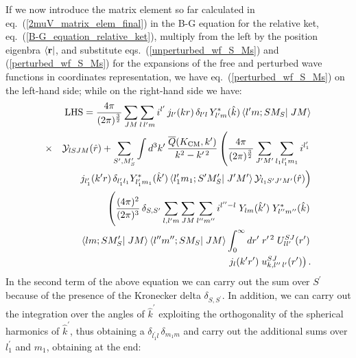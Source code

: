 \documentclass[aps,twocolumn,showpacs,preprintnumbers,amsmath,amssymb,nofootinbib,superscriptaddress,showkeys,noeprint]{revtex4-1}
\newcommand{\nr}{{\bf r}}
\begin{document}
If we now introduce the matrix element so far calculated in
eq.~(\ref{2muV_matrix_elem_final}) in the B-G equation for the
relative ket, eq.~(\ref{B-G_equation_relative_ket}), multiply from the
left by the position eigenbra $\left\langle \nr\right|$, and
substitute eqs.~(\ref{unperturbed_wf_S_Ms}) and
(\ref{perturbed_wf_S_Ms}) for the expansions of the free and perturbed
wave functions in coordinates representation, we have
eq.~(\ref{perturbed_wf_S_Ms}) on the left-hand side; while on the
right-hand side we have:
\begin{eqnarray}
 &&{\rm LHS}=\frac{4\pi}{(2\pi)^\frac32}
 \sum_{JM}\sum_{l\,l^\prime m}
 i^{l^\prime}\,
 j_{l^\prime}(kr)\,
 \delta_{l^\prime l}\,
 Y^*_{l^\prime m}(\hat{k}) \left\langle
 l^\prime m;SM_S\right|
 \left. JM\right\rangle
 \nonumber\\
&\times& \mathcal{Y}_{lSJM}(\hat{r})+
\sum_{S^\prime,M^\prime_S}\int d^3k^\prime\,
\frac{\overline{Q}(K_{\rm CM},k^\prime)}{k^2-k^{\prime\,2}}
\left(\frac{4\pi}{(2\pi)^\frac32}
\sum_{J^\prime M^\prime}
\sum_{l_1 l^\prime_1 m_1} i^{l^\prime_1}
\right.\nonumber\\
&&\left. j_{l^\prime_1}(k^\prime r)\,
\delta_{l^\prime_1 l_1}
Y^*_{l^\prime_1 m_1}(\hat{k}^\prime)
\left\langle l^\prime_1
m_1;S^\prime M^\prime_S
\right|\left. J^\prime
M^\prime\right\rangle
\mathcal{Y}_{l_1 S^\prime J^\prime M^\prime}(\hat{r})
\right)\nonumber\\
&&\left(
\frac{(4\pi)^2}{(2\pi)^3}\,
\delta_{S,S^\prime}
\sum_{l,l^\prime m}
\sum_{JM}\sum_{l^{\prime\prime}m^{\prime\prime}}
i^{l^{\prime\prime}-l}
\;Y_{lm}(\hat{k}^\prime)
\;Y^*_{l^{\prime\prime}m^{\prime\prime}}(\hat{k})\right.
\nonumber\\
&&\left.\left\langle
lm;SM^\prime_S\right|
\left. JM\right\rangle
\left\langle l^{\prime\prime}m^{\prime\prime};SM_S
\right|\left. JM
\right\rangle
\int^\infty_0 dr^\prime
\; r^{\prime\,2}\;
U^{SJ}_{l l^\prime}(r^\prime)\right.\nonumber\\
&&\left.j_l(k^\prime
r^\prime)\;u^{SJ}_{k,l^{\prime\prime}\,l^\prime}(r^\prime)
\right).\label{rhs_bg_eq_relative}
\end{eqnarray}
In the second term of the above equation we can carry out the sum over
$S^\prime$ because of the presence of the Kronecker delta
$\delta_{S,S^\prime}$.  In addition, we can carry out the integration
over the angles of $\hat{k}^\prime$ exploiting the orthogonality of
the spherical harmonics of $\hat{k}^\prime$, thus obtaining a
$\delta_{l^\prime_1 l}\, \delta_{m_1 m}$ and carry out the additional
sums over $l^\prime_1$ and $m_1$, obtaining at the end:
\end{document}
